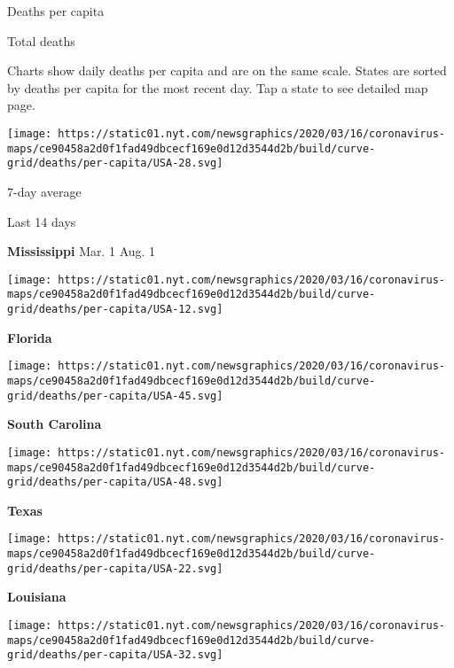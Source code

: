 Deaths per capita

Total deaths

Charts show daily deaths per capita and are on the same scale. States
are sorted by deaths per capita for the most recent day. Tap a state to
see detailed map page.

\href{https://www.nytimes.com/interactive/2020/us/mississippi-coronavirus-cases.html}{}

\texttt{[image: https://static01.nyt.com/newsgraphics/2020/03/16/coronavirus-maps/ce90458a2d0f1fad49dbcecf169e0d12d3544d2b/build/curve-grid/deaths/per-capita/USA-28.svg]}

7-day average

Last 14 days

\textbf{Mississippi} Mar. 1 Aug. 1

\href{https://www.nytimes.com/interactive/2020/us/florida-coronavirus-cases.html}{}

\texttt{[image: https://static01.nyt.com/newsgraphics/2020/03/16/coronavirus-maps/ce90458a2d0f1fad49dbcecf169e0d12d3544d2b/build/curve-grid/deaths/per-capita/USA-12.svg]}

\textbf{Florida}

\href{https://www.nytimes.com/interactive/2020/us/south-carolina-coronavirus-cases.html}{}

\texttt{[image: https://static01.nyt.com/newsgraphics/2020/03/16/coronavirus-maps/ce90458a2d0f1fad49dbcecf169e0d12d3544d2b/build/curve-grid/deaths/per-capita/USA-45.svg]}

\textbf{South Carolina}

\href{https://www.nytimes.com/interactive/2020/us/texas-coronavirus-cases.html}{}

\texttt{[image: https://static01.nyt.com/newsgraphics/2020/03/16/coronavirus-maps/ce90458a2d0f1fad49dbcecf169e0d12d3544d2b/build/curve-grid/deaths/per-capita/USA-48.svg]}

\textbf{Texas}

\href{https://www.nytimes.com/interactive/2020/us/louisiana-coronavirus-cases.html}{}

\texttt{[image: https://static01.nyt.com/newsgraphics/2020/03/16/coronavirus-maps/ce90458a2d0f1fad49dbcecf169e0d12d3544d2b/build/curve-grid/deaths/per-capita/USA-22.svg]}

\textbf{Louisiana}

\href{https://www.nytimes.com/interactive/2020/us/nevada-coronavirus-cases.html}{}

\texttt{[image: https://static01.nyt.com/newsgraphics/2020/03/16/coronavirus-maps/ce90458a2d0f1fad49dbcecf169e0d12d3544d2b/build/curve-grid/deaths/per-capita/USA-32.svg]}

